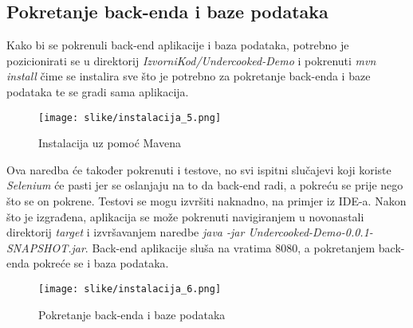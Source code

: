 			\subsection{Pokretanje back-enda i baze podataka}
			Kako bi se pokrenuli back-end aplikacije i baza podataka, potrebno je pozicionirati se u direktorij \textit{IzvorniKod/Undercooked-Demo} i pokrenuti \textit{mvn install} čime se instalira sve što je potrebno za pokretanje back-enda i baze podataka te se gradi sama aplikacija.
			\begin{figure}[H]
				\texttt{[image: slike/instalacija\_5.png]} %
				\centering
				\caption{Instalacija uz pomoć Mavena}
				\label{fig:Instalacija uz pomoć Mavena}
			\end{figure}
			Ova naredba će također pokrenuti i testove, no svi ispitni slučajevi koji koriste \textit{Selenium} će pasti jer se oslanjaju na to da back-end radi, a pokreću se prije nego što se on pokrene. Testovi se mogu izvršiti naknadno, na primjer iz IDE-a. Nakon što je izgrađena, aplikacija se može pokrenuti navigiranjem u novonastali direktorij \textit{target} i izvršavanjem naredbe \textit{java -jar Undercooked-Demo-0.0.1-SNAPSHOT.jar}. Back-end aplikacije sluša na vratima 8080, a pokretanjem back-enda pokreće se i baza podataka.
			\begin{figure}[H]
				\texttt{[image: slike/instalacija\_6.png]} %
				\centering
				\caption{Pokretanje back-enda i baze podataka}
				\label{fig:Pokretanje back-enda i baze podataka}
			\end{figure}
			\eject 